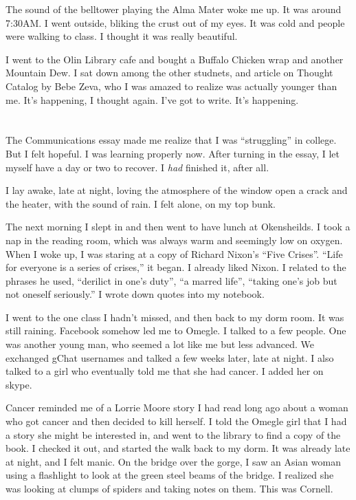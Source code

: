 The sound of the belltower playing the Alma Mater woke me up.  It was around
7:30AM.  I went outside, bliking the crust out of my eyes.  It was cold and
people were walking to class.   I thought it was really beautiful. 

I went to the Olin Library cafe and bought a Buffalo Chicken wrap and another
Mountain Dew.  I sat down among the other studnets, and article on Thought
Catalog by Bebe Zeva, who I was amazed to realize was actually younger than me.
It's happening, I thought again.  I've got to write.  It's happening.

\section{}

The Communications essay made me realize that I was ``struggling'' in college.
But I felt hopeful. I was learning properly now.  After turning in the essay, I
let myself have a  day or two to recover.  I \textit{had} finished it, after
all.  

I lay awake, late at night, loving the atmosphere of the window open a crack and
the heater, with the sound of rain.  I felt alone, on my top bunk. 

The next morning I slept in and then went to have lunch at Okensheilds.  I took
a nap in the reading room, which was always warm and seemingly low on oxygen.
When I woke up, I was staring at a copy of Richard Nixon's ``Five Crises''.
``Life for everyone is a series of crises,'' it began.  I already liked Nixon.
I related to the phrases he used, ``derilict in one's duty'', ``a marred life'',
``taking one's job but not oneself seriously.''  I wrote down quotes into my
notebook.

I went to the one class I hadn't missed, and then back to my dorm room.  It was
still raining.  Facebook somehow led me to Omegle.  I talked to a few people.
One was another young man, who seemed a lot like me but less advanced.  We
exchanged gChat usernames and talked a few weeks later, late at night.  I also
talked to a girl who eventually told me that she had cancer.  I added her on
skype.  

Cancer reminded me of a Lorrie Moore story I had read long ago about a woman who
got cancer and then decided to kill herself.  I told the Omegle girl that I had
a story she might be interested in, and went to the library to find a copy of
the book.  I checked it out, and started the walk back to my dorm.  It was
already late at night, and I felt manic.  On the bridge over the gorge, I saw an
Asian woman using a flashlight to look at the green steel beams of the bridge.
I realized she was looking at clumps of spiders and taking notes on them.  This
was Cornell.

